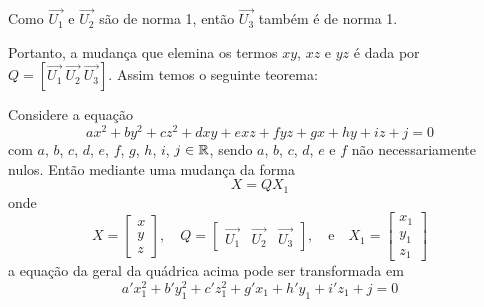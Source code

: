 \documentclass{beamer}
\begin{document}
\begin{frame}
    Como $\vec{U_1}$ \pause e $\vec{U_2}$ \pause são de norma 1, \pause então $\vec{U_3}$ \pause também é de norma 1.\pause

    Portanto, a mudança que elemina os termos $xy$, \pause $xz$ \pause e $yz$ \pause é dada por \pause $Q = [\vec{U_1}\  \vec{U_2}\ \vec{U_3}]$. \pause Assim temos o seguinte teorema:
\end{frame}

\begin{frame}
    \begin{teorema}
        Considere a equação\pause
        \[
            ax^2 + by^2 + cz^2 + dxy + exz + fyz + gx + hy + iz + j = 0
        \]\pause
        com $a$, $b$, $c$, $d$, $e$, $f$, $g$, $h$, $i$, $j \in \mathbb{R}$, \pause sendo $a$, $b$, $c$, $d$, $e$ e $f$ não necessariamente nulos. \pause Então mediante uma mudança da forma\pause
        \[
            X = Q X_1
        \]\pause
        onde\pause
        \[
            X = \begin{bmatrix}
                x \\y\\z
            \end{bmatrix}, \quad
            Q = \begin{bmatrix}
                \vec{U_1} & \vec{U_2} & \vec{U_3}
            \end{bmatrix}, \quad\mbox{e}\quad
            X_1 = \begin{bmatrix}
                x_1 \\y_1\\z_1
            \end{bmatrix}
        \]\pause
        a equação da geral da quádrica \pause acima pode ser transformada em\pause
        \[
            a'x_1^2 + b'y_1^2 + c'z_1^2 + g'x_1 + h'y_1 + i'z_1 + j = 0
        \]
    \end{teorema}
\end{frame}
\end{document}

